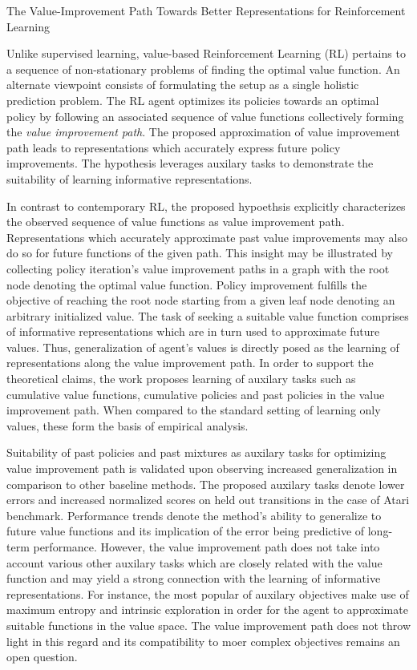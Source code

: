 \documentclass[11pt,letterpaper]{article}
\begin{document}
\begin{center}
  \large{The Value-Improvement Path Towards Better Representations for Reinforcement Learning}
\end{center}
Unlike supervised learning, value-based Reinforcement Learning (RL) pertains to a sequence of non-stationary problems of finding the optimal value function. An alternate viewpoint consists of formulating the setup as a single holistic prediction problem. The RL agent optimizes its policies towards an optimal policy by following an associated sequence of value functions collectively forming the \textit{value improvement path}. The proposed approximation of value improvement path leads to representations which accurately express future policy improvements. The hypothesis leverages auxilary tasks to demonstrate the suitability of learning informative representations.

In contrast to contemporary RL, the proposed hypoethsis explicitly characterizes the observed sequence of value functions as value improvement path. Representations which accurately approximate past value improvements may also do so for future functions of the given path. This insight may be illustrated by collecting policy iteration's value improvement paths in a graph with the root node denoting the optimal value function. Policy improvement fulfills the objective of reaching the root node starting from a given leaf node denoting an arbitrary initialized value. The task of seeking a suitable value function comprises of informative representations which are in turn used to approximate future values. Thus, generalization of agent's values is directly posed as the learning of representations along the value improvement path. In order to support the theoretical claims, the work proposes learning of auxilary tasks such as cumulative value functions, cumulative policies and past policies in the value improvement path. When compared to the standard setting of learning only values, these form the basis of empirical analysis.

Suitability of past policies and past mixtures as auxilary tasks for optimizing value improvement path is validated upon observing increased generalization in comparison to other baseline methods. The proposed auxilary tasks denote lower errors and increased normalized scores on held out transitions in the case of Atari benchmark. Performance trends denote the method's ability to generalize to future value functions and its implication of the error being predictive of long-term performance. However, the value improvement path does not take into account various other auxilary tasks which are closely related with the value function and may yield a strong connection with the learning of informative representations. For instance, the most popular of auxilary objectives make use of maximum entropy and intrinsic exploration in order for the agent to approximate suitable functions in the value space. The value improvement path does not throw light in this regard and its compatibility to moer complex objectives remains an open question.
\end{document}
